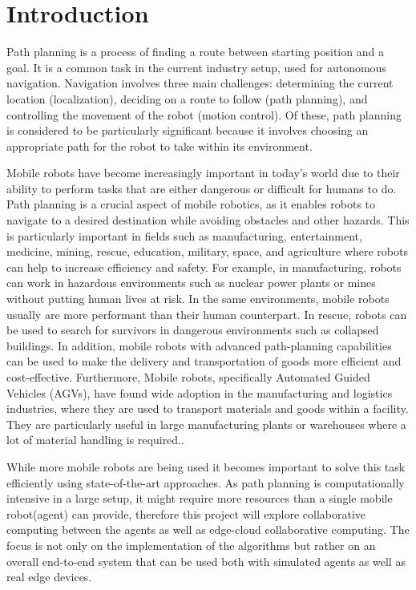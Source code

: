 \chapter{Introduction}

Path planning is a process of finding a route between starting position and a goal. It is a common task in the current industry setup, used for autonomous navigation. Navigation involves three main challenges: determining the current location (localization), deciding on a route to follow (path planning), and controlling the movement of the robot (motion control). Of these, path planning is considered to be particularly significant because it involves choosing an appropriate path for the robot to take within its environment\cite{path_lanning_intro}. 

Mobile robots have become increasingly important in today's world due to their ability to perform tasks that are either dangerous or difficult for humans to do. Path planning is a crucial aspect of mobile robotics, as it enables robots to navigate to a desired destination while avoiding obstacles and other hazards. This is particularly important in fields such as manufacturing, entertainment, medicine, mining, rescue, education, military, space, and agriculture where robots can help to increase efficiency and safety. For example, in manufacturing, robots can work in hazardous environments such as nuclear power plants or mines without putting human lives at risk. In the same environments, mobile robots usually are more performant than their human counterpart. In rescue, robots can be used to search for survivors in dangerous environments such as collapsed buildings. In addition, mobile robots with advanced path-planning capabilities can be used to make the delivery and transportation of goods more efficient and cost-effective. Furthermore, Mobile robots, specifically Automated Guided Vehicles (AGVs), have found wide adoption in the manufacturing and logistics industries, where they are used to transport materials and goods within a facility. They are particularly useful in large manufacturing plants or warehouses where a lot of material handling is required.\cite{intro_mobile_robots}. 

While more mobile robots are being used it becomes important to solve this task efficiently using state-of-the-art approaches. As path planning is computationally intensive in a large setup, it might require more resources than a single mobile robot(agent) can provide, therefore this project will explore collaborative computing between the agents as well as edge-cloud collaborative computing. The focus is not only on the implementation of the algorithms but rather on an overall end-to-end system that can be used both with simulated agents as well as real edge devices.

